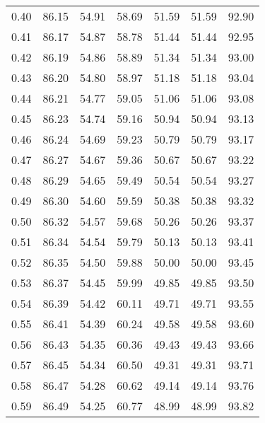 \begin{tabular}{|c|c|c|c|c|c|c|}
      0.40 &     86.15 &     54.91 &      58.69 &   51.59 &      51.59 &         92.90 \\
      0.41 &     86.17 &     54.87 &      58.78 &   51.44 &      51.44 &         92.95 \\
      0.42 &     86.19 &     54.86 &      58.89 &   51.34 &      51.34 &         93.00 \\
      0.43 &     86.20 &     54.80 &      58.97 &   51.18 &      51.18 &         93.04 \\
      0.44 &     86.21 &     54.77 &      59.05 &   51.06 &      51.06 &         93.08 \\
      0.45 &     86.23 &     54.74 &      59.16 &   50.94 &      50.94 &         93.13 \\
      0.46 &     86.24 &     54.69 &      59.23 &   50.79 &      50.79 &         93.17 \\
      0.47 &     86.27 &     54.67 &      59.36 &   50.67 &      50.67 &         93.22 \\
      0.48 &     86.29 &     54.65 &      59.49 &   50.54 &      50.54 &         93.27 \\
      0.49 &     86.30 &     54.60 &      59.59 &   50.38 &      50.38 &         93.32 \\
      0.50 &     86.32 &     54.57 &      59.68 &   50.26 &      50.26 &         93.37 \\
      0.51 &     86.34 &     54.54 &      59.79 &   50.13 &      50.13 &         93.41 \\
      0.52 &     86.35 &     54.50 &      59.88 &   50.00 &      50.00 &         93.45 \\
      0.53 &     86.37 &     54.45 &      59.99 &   49.85 &      49.85 &         93.50 \\
      0.54 &     86.39 &     54.42 &      60.11 &   49.71 &      49.71 &         93.55 \\
      0.55 &     86.41 &     54.39 &      60.24 &   49.58 &      49.58 &         93.60 \\
      0.56 &     86.43 &     54.35 &      60.36 &   49.43 &      49.43 &         93.66 \\
      0.57 &     86.45 &     54.34 &      60.50 &   49.31 &      49.31 &         93.71 \\
      0.58 &     86.47 &     54.28 &      60.62 &   49.14 &      49.14 &         93.76 \\
      0.59 &     86.49 &     54.25 &      60.77 &   48.99 &      48.99 &         93.82 \\

\end{tabular}
